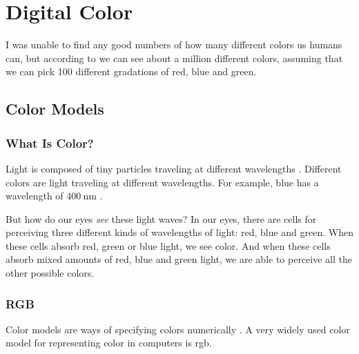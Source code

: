 \begin{comment}
  
\end{comment}

\chapter{Digital Color}
\label{cha:color}

\cite{niederst1999webdesign}




I was unable to find any good numbers of how many different colors us
humans can, but according to \cite{roth:_tetrachromat} we can see
about a million different colors, assuming  that we can pick 100
different gradations of red, blue and green.

  \section{Color Models}
  \label{sec:color-models}

  \subsection{What Is Color?}
  \label{sec:what-color}

  \newcommand{\bluewave}{\ensuremath{\SI{400}{\nano\meter}}}

  Light is composed of tiny particles traveling at different
  wavelengths \cite{neider93:_openg_progr_guide}.
  Different colors are light traveling at different wavelengths. For
  example, blue has a wavelength of \bluewave
  \cite{ohlsson99:_digit_bild_kreat}.

  But how do our eyes \textit{see} these light waves? In our eyes,
  there are cells for perceiving three different kinds of wavelengths
  of light: red, blue and green. When these cells absorb red, green or
  blue light, we see color. And when these cells absorb mixed amounts
  of red, blue and green light, we are able to perceive all the other
  possible colors.

  \subsection{RGB}
  \label{sec:rgb}

  Color models are ways of specifying colors
  numerically \cite{fadgi11:color_model}. A very widely used color
  model for representing color in computers is rgb.

